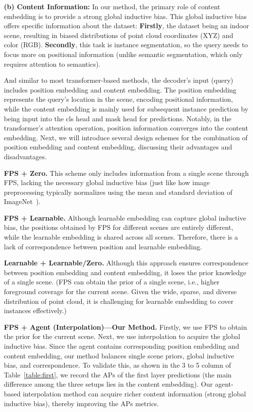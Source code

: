 \textbf{(b) Content Information:} In our method, the primary role of content embedding is to provide a strong global inductive bias. This global inductive bias offers specific information about the dataset: \textbf{Firstly}, the dataset being an indoor scene, resulting in biased distributions of point cloud coordinates (XYZ) and color (RGB). \textbf{Secondly}, this task is instance segmentation, so the query needs to focus more on positional information (unlike semantic segmentation, which only requires attention to semantics). 

And similar to most transformer-based methods, the decoder's input (query) includes position embedding and content embedding. The position embedding represents the query's location in the scene, encoding positional information, while the content embedding is mainly used for subsequent instance prediction by being input into the cls head and mask head for predictions. Notably, in the transformer's attention operation, position information converges into the content embedding. Next, we will introduce several design schemes for the combination of position embedding and content embedding, discussing their advantages and disadvantages.

\textbf{FPS + Zero.} This scheme only includes information from a single scene through FPS, lacking the necessary global inductive bias (just like how image preprocessing typically normalizes using the mean and standard deviation of ImageNet~\cite{deng2009imagenet}).

\textbf{FPS + Learnable.} Although learnable embedding can capture global inductive bias, the positions obtained by FPS for different scenes are entirely different, while the learnable embedding is shared across all scenes. Therefore, there is a lack of correspondence between position and learnable embedding.

\textbf{Learnable + Learnable/Zero.} Although this approach ensures correspondence between position embedding and content embedding, it loses the prior knowledge of a single scene. (FPS can obtain the prior of a single scene, i.e., higher foreground coverage for the current scene. Given the wide, sparse, and diverse distribution of point cloud, it is challenging for learnable embedding to cover instances effectively.)

\textbf{FPS + Agent (Interpolation)—Our Method.} Firstly, we use FPS to obtain the prior for the current scene. Next, we use interpolation to acquire the global inductive bias. Since the agent contains corresponding position embedding and content embedding, our method balances single scene priors, global inductive bias, and correspondence. To validate this, as shown in the 3 to 5 column of Table~\ref{table:first}, we record the APs of the first layer predictions (the main difference among the three setups lies in the content embedding). Our agent-based interpolation method can acquire richer content information (strong global inductive bias), thereby improving the APs metrics.
